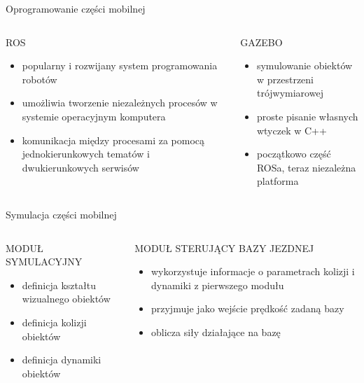 \begin{frame}{Oprogramowanie części mobilnej}
	\begin{columns}
		\begin{column}{0.5\textwidth}
			\begin{center}
				ROS
			\end{center}
			\begin{itemize}
				\item popularny i rozwijany system programowania robotów
				\item umożliwia tworzenie niezależnych procesów w systemie operacyjnym komputera
				\item komunikacja między procesami za pomocą jednokierunkowych tematów i dwukierunkowych serwisów
			\end{itemize}
			
		\end{column}
		\begin{column}{0.5\textwidth}  %
			\begin{center}
				GAZEBO
			\end{center}
			\begin{itemize}
				\item symulowanie obiektów w przestrzeni trójwymiarowej
				\item proste pisanie własnych wtyczek w C++
				\item początkowo część ROSa, teraz niezależna platforma
			\end{itemize}
		\end{column}
	\end{columns}
\end{frame}


\begin{frame}{Symulacja części mobilnej}
	\begin{columns}
		\begin{column}{0.5\textwidth}
			\begin{center}
				MODUŁ SYMULACYJNY
			\end{center}
			\begin{itemize}
				\item definicja kształtu wizualnego obiektów
				\item definicja kolizji obiektów
				\item definicja dynamiki obiektów
			\end{itemize}
			
		\end{column}
		\begin{column}{0.5\textwidth}  %
			\begin{center}
				MODUŁ STERUJĄCY BAZY JEZDNEJ
			\end{center}
			\begin{itemize}
				\item wykorzystuje informacje o parametrach kolizji i dynamiki z pierwszego modułu
				\item przyjmuje jako wejście prędkość zadaną bazy
				\item oblicza siły działające na bazę
			\end{itemize}
		\end{column}
	\end{columns}
\end{frame}

